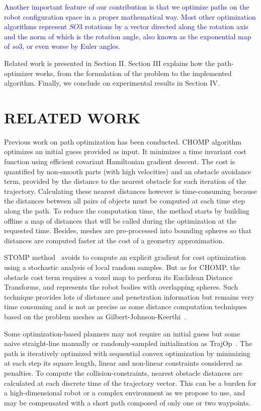 \documentclass{tADR2e}
\begin{document}
\textcolor{blue}{Another important feature of our contribution is that we optimize paths on the robot configuration space in a proper mathematical way. Most other optimization algorithms represent $SO3$ rotations by a vector directed along the rotation axis and the norm of which is the rotation angle, also known as the exponential map of $so3$, or even worse by Euler angles.}

Related work is presented in Section II. Section III explains how the 
path-optimizer works, from the formulation of the problem to the implemented
algorithm. Finally, we conclude on experimental results in Section IV.

\section{RELATED WORK}
Previous work on path optimization has been conducted. CHOMP algorithm~\cite{chompIjrr} optimizes an initial guess provided as
input. It minimizes a time invariant cost function using efficient covariant
Hamiltonian gradient descent. The cost is quantified by non-smooth parts (with
high velocities) and an obstacle avoidance term, provided by the distance to the 
nearest obstacle for each iteration of the trajectory. Calculating these nearest 
distances however is time-consuming because the distances between all pairs of 
objects must be computed at each time step along the path. To reduce the 
computation time, the method starts by building offline a map of distances that 
will be called during the optimization at the requested time. Besides, meshes 
are pre-processed into bounding spheres so that distances are computed faster 
at the cost of a geometry approximation.

STOMP method~\cite{KalakrishnanStomp} avoids to compute an 
explicit gradient for cost optimization using a stochastic analysis of local 
random samples. But as for CHOMP, the obstacle cost term requires a voxel map to 
perform its Euclidean Distance Transforms, and represents the robot bodies with 
overlapping spheres. Such technique provides lots of distance and penetration 
information but remains very time consuming and is not as precise as some 
distance computation techniques based on the problem meshes as 
Gilbert-Johnson-Keerthi~\cite{gilbertGjk}.

Some optimization-based planners may not require an initial guess but some naive 
straight-line manually or randomly-sampled initialization as 
TrajOp~\cite{SchulmanConvexOptim}. The path is iteratively optimized with 
sequential convex optimization by minimizing at each step its square length, 
linear and non-linear constraints considered as penalties. To compute the 
collision-constraints, nearest obstacle distances are calculated at each discrete 
time of the trajectory vector. This can be a burden for a high-dimensional robot 
or a complex environment as we propose to use, and may be compensated with a 
short path composed of only one or two waypoints.
\end{document}
